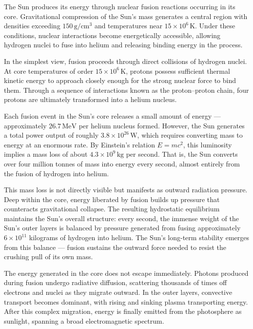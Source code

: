 The Sun produces its energy through nuclear fusion reactions occurring in its core. Gravitational compression of the Sun's mass generates a central region with densities exceeding $150\,\text{g}/\text{cm}^3$ and temperatures near $15 \times 10^6\,\text{K}$. Under these conditions, nuclear interactions become energetically accessible, allowing hydrogen nuclei to fuse into helium and releasing binding energy in the process.

In the simplest view, fusion proceeds through direct collisions of hydrogen nuclei. At core temperatures of order $15 \times 10^6\,\text{K}$, protons possess sufficient thermal kinetic energy to approach closely enough for the strong nuclear force to bind them. Through a sequence of interactions known as the proton–proton chain, four protons are ultimately transformed into a helium nucleus. 

Each fusion event in the Sun's core releases a small amount of energy — approximately $26.7\,\text{MeV}$ per helium nucleus formed. However, the Sun generates a total power output of roughly $3.8 \times 10^{26}\,\text{W}$, which requires converting mass to energy at an enormous rate. By Einstein's relation $E = mc^2$, this luminosity implies a mass loss of about $4.3 \times 10^9\,\text{kg}$ per second. That is, the Sun converts over four million tonnes of mass into energy every second, almost entirely from the fusion of hydrogen into helium.

This mass loss is not directly visible but manifests as outward radiation pressure. Deep within the core, energy liberated by fusion builds up pressure that counteracts gravitational collapse. The resulting hydrostatic equilibrium maintains the Sun's overall structure: every second, the immense weight of the Sun's outer layers is balanced by pressure generated from fusing approximately $6 \times 10^{11}$ kilograms of hydrogen into helium. The Sun's long-term stability emerges from this balance — fusion sustains the outward force needed to resist the crushing pull of its own mass.

The energy generated in the core does not escape immediately. Photons produced during fusion undergo radiative diffusion, scattering thousands of times off electrons and nuclei as they migrate outward. In the outer layers, convective transport becomes dominant, with rising and sinking plasma transporting energy. After this complex migration, energy is finally emitted from the photosphere as sunlight, spanning a broad electromagnetic spectrum.

